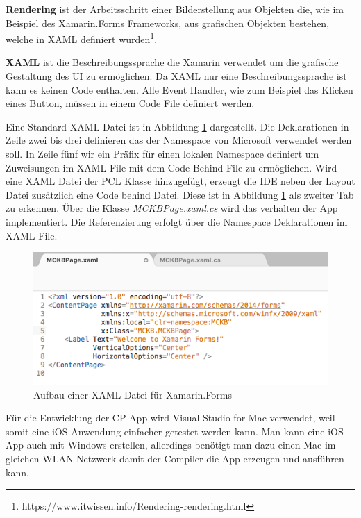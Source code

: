	\textbf{Rendering} ist der Arbeitsschritt einer Bilderstellung aus Objekten die, wie im Beispiel des Xamarin.Forms Frameworks, aus grafischen Objekten bestehen, welche in XAML definiert wurden\footnote{https://www.itwissen.info/Rendering-rendering.html}.

	\textbf{XAML} ist die Beschreibungssprache die Xamarin verwendet um die grafische Gestaltung des UI zu ermöglichen. Da XAML nur eine Beschreibungssprache ist kann es keinen Code enthalten. Alle Event Handler, wie zum Beispiel das Klicken eines Button, müssen in einem Code File definiert werden.

	\newpage
	Eine Standard XAML Datei ist in Abbildung \ref{fig:xamarinaformxamlpreview} dargestellt. Die Deklarationen in Zeile zwei bis drei definieren das der Namespace von Microsoft verwendet werden soll. In Zeile fünf wir ein Präfix für einen lokalen Namespace definiert um Zuweisungen im XAML File mit dem Code Behind File zu ermöglichen. Wird eine XAML Datei der PCL Klasse hinzugefügt, erzeugt die IDE neben der Layout Datei zusätzlich eine Code behind Datei. Diese ist in Abbildung \ref{fig:xamarinaformxamlpreview} als zweiter Tab zu erkennen. Über die Klasse \textit{MCKBPage.xaml.cs} wird das verhalten der App implementiert. Die Referenzierung erfolgt über die Namespace Deklarationen im XAML File.

	\begin{figure}[h!]
		\centering
		\includegraphics[width=1\textwidth]{images/XAML-preview.png}
		\caption[Aufbau einer XAML Datei für Xamarin.Forms]{Aufbau einer XAML Datei für Xamarin.Forms}
		\label{fig:xamarinaformxamlpreview}
	\end{figure}
	Für die Entwicklung der CP App wird Visual Studio for Mac verwendet, weil somit eine iOS Anwendung einfacher getestet werden kann. Man kann eine iOS App auch mit Windows erstellen, allerdings benötigt man dazu einen Mac im gleichen WLAN Netzwerk damit der Compiler die App erzeugen und ausführen kann.


